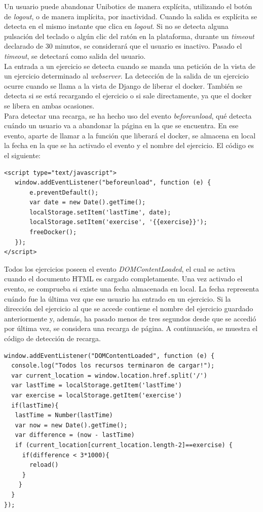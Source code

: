 Un usuario puede abandonar Unibotics de manera explícita, utilizando el botón de \textit{logout}, o de manera implícita, por inactividad. Cuando la salida es explícita se detecta en el mismo instante que clica en \textit{logout}.  Si no se detecta alguna pulsación del teclado o algún clic del ratón en la plataforma, durante un \textit{timeout} declarado de 30 minutos, se considerará que el usuario es inactivo. Pasado el \textit{timeout}, se detectará como salida del usuario.\\

La entrada a un ejercicio se detecta cuando se manda una petición de la vista de un ejercicio determinado al \textit{webserver}. La detección de la salida de un ejercicio ocurre cuando se llama a la vista de Django de liberar el docker. También se detecta si se está recargando el ejercicio o si sale directamente, ya que el docker se libera en ambas ocasiones.\\

Para detectar una recarga, se ha hecho uso del evento \textit{beforeunload}, qué detecta cuándo un usuario va a abandonar la página en la que se encuentra. En ese evento, aparte de llamar a la función que liberará el docker, se almacena en local la fecha en la que se ha activado el evento y el nombre del ejercicio. El código es el siguiente: \\
\newpage
\begin{lstlisting}
<script type="text/javascript">
   window.addEventListener("beforeunload", function (e) {
       e.preventDefault();
       var date = new Date().getTime();
       localStorage.setItem('lastTime', date);
       localStorage.setItem('exercise', '{{exercise}}');
       freeDocker();
   });
</script>
\end{lstlisting} 
Todos los ejercicios poseen el evento \textit{DOMContentLoaded}, el cual se activa cuando el documento HTML es cargado completamente. Una vez activado el evento, se comprueba si existe una fecha almacenada en local. La fecha representa cuándo fue la última vez que ese usuario ha entrado en un ejercicio. Si la dirección del ejercicio al que se accede contiene el nombre del ejercicio guardado anteriormente y, además, ha pasado menos de tres segundos desde que se accedió por última vez, se considera una recarga de página. A continuación, se muestra el código de detección de recarga.
\begin{lstlisting}
window.addEventListener("DOMContentLoaded", function (e) {
  console.log("Todos los recursos terminaron de cargar!");
  var current_location = window.location.href.split('/')
  var lastTime = localStorage.getItem('lastTime')
  var exercise = localStorage.getItem('exercise')
  if(lastTime){
   lastTime = Number(lastTime)
   var now = new Date().getTime();
   var difference = (now - lastTime)
   if (current_location[current_location.length-2]==exercise) {
     if(difference < 3*1000){
       reload()
     }
    }
  }
});
\end{lstlisting} 

